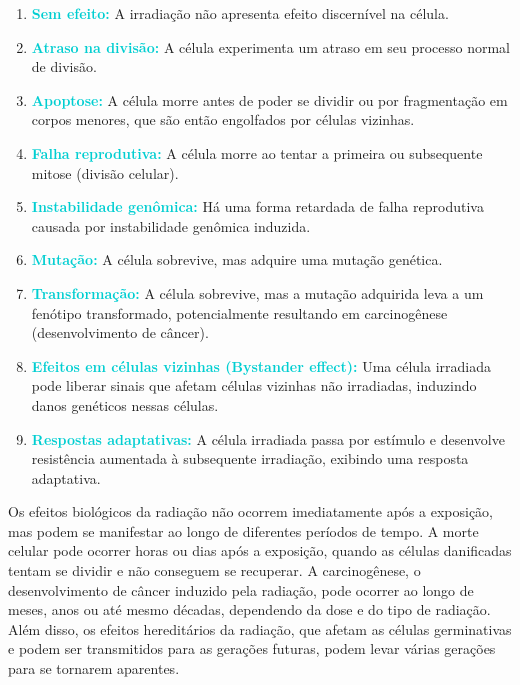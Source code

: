 \documentclass[11pt,a4paper]{article}
\begin{document}
	\begin{enumerate}
		\item \textcolor{DarkTurquoise}{\textbf{Sem efeito:}} A irradiação não apresenta efeito discernível na célula.
		\item \textcolor{DarkTurquoise}{\textbf{Atraso na divisão:}} A célula experimenta um atraso em seu processo normal de divisão.
		\item \textcolor{DarkTurquoise}{\textbf{Apoptose:}} A célula morre antes de poder se dividir ou por fragmentação em corpos menores, que são então engolfados por células vizinhas.
		\item \textcolor{DarkTurquoise}{\textbf{Falha reprodutiva:}} A célula morre ao tentar a primeira ou subsequente mitose (divisão celular).
		\item \textcolor{DarkTurquoise}{\textbf{Instabilidade genômica:}} Há uma forma retardada de falha reprodutiva causada por instabilidade genômica induzida.
		\item \textcolor{DarkTurquoise}{\textbf{Mutação:}} A célula sobrevive, mas adquire uma mutação genética.
		\item \textcolor{DarkTurquoise}{\textbf{Transformação:}} A célula sobrevive, mas a mutação adquirida leva a um fenótipo transformado, potencialmente resultando em carcinogênese (desenvolvimento de câncer).
		\item \textcolor{DarkTurquoise}{\textbf{Efeitos em células vizinhas (Bystander effect):}} Uma célula irradiada pode liberar sinais que afetam células vizinhas não irradiadas, induzindo danos genéticos nessas células.
		\item \textcolor{DarkTurquoise}{\textbf{Respostas adaptativas:}} A célula irradiada passa por estímulo e desenvolve resistência aumentada à subsequente irradiação, exibindo uma resposta adaptativa.
	\end{enumerate}

	Os efeitos biológicos da radiação não ocorrem imediatamente após a exposição, mas podem se manifestar ao longo de diferentes períodos de tempo. A morte celular pode ocorrer horas ou dias após a exposição, quando as células danificadas tentam se dividir e não conseguem se recuperar. A carcinogênese, o desenvolvimento de câncer induzido pela radiação, pode ocorrer ao longo de meses, anos ou até mesmo décadas, dependendo da dose e do tipo de radiação. Além disso, os efeitos hereditários da radiação, que afetam as células germinativas e podem ser transmitidos para as gerações futuras, podem levar várias gerações para se tornarem aparentes.
\end{document}
